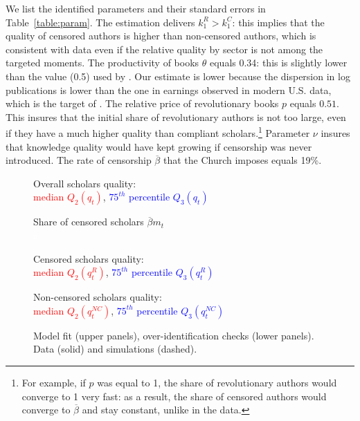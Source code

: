 We list the identified parameters and their standard errors in Table~\ref{table:param}. The estimation delivers $k^R_1>k^C_1$: this implies that the quality of censored authors is higher than non-censored authors, which is consistent with data even if the relative quality by sector is not among the targeted moments. The productivity of books $\theta$ equals 0.34: this is slightly lower than the value (0.5) used by . Our estimate is lower because the dispersion in log publications is lower than the one in earnings observed in modern U.S. data, which is the target of .
 The relative price of revolutionary books $p$ equals $0.51$. This insures that the initial share of revolutionary authors is not too large, even if they have a much higher quality than compliant scholars.\footnote{For example, if $p$ was equal to 1, the share of revolutionary authors would converge to 1 very fast: as a result, the share of censored authors would converge to $\overline{\beta}$ and stay constant, unlike in the data.} Parameter $\nu$ insures that knowledge quality would have kept growing if censorship was never introduced. The rate of censorship $\overline{\beta}$ that the Church imposes equals 19\%.





\begin{figure}[p]	
\hspace{0mm}
\parbox{.49\textwidth}{
		\centering
		{Overall scholars quality:\\ \textcolor{red}{median $Q_2(q_t)$}, \textcolor{blue}{$75^{th}$ percentile $Q_3(q_t)$}}

\scalebox{0.55}{}
}\hspace{-6mm}
\parbox{.49\textwidth}{
		\centering
{Share of censored scholars $\overline{\beta}m_t$\\
\textcolor{white}{a}}

\scalebox{0.55}{}
}

\vspace{10mm}
\hspace{0mm}
\parbox{.49\textwidth}{
		\centering
{Censored scholars quality:\\ \textcolor{red}{median $Q_2(q_t^R)$}, \textcolor{blue}{$75^{th}$ percentile $Q_3(q_t^R)$}}

\scalebox{0.55}{ }
}\hspace{-4mm}
\parbox{.49\textwidth}{
		\centering
{Non-censored scholars
quality:\\ \textcolor{red}{median $Q_2(q_t^{NC})$}, \textcolor{blue}{$75^{th} $ percentile $Q_3(q_t^{NC})$}}

\scalebox{0.55}{}
}
	\caption{Model fit (upper panels), over-identification checks (lower panels).\\ Data (solid) and simulations (dashed).}
	\label{fig:fit}
\end{figure}

